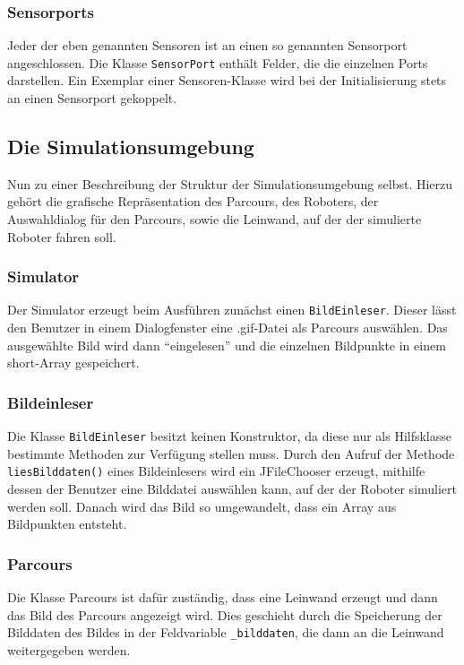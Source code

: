 \documentclass[paper=a4, pagesize, DIV=calc, BCOR=12.5mm, twoside=on, onecolumn=on, open = any, titlepage =on, parskip =half-, headsepline = on, footsepline = on, chapterprefix = on, appendixprefix = off, fontsize = 12pt, numbers = noenddot, abstract = on]{scrbook}
\numberwithin{equation}{chapter}
\theoremstyle{definition}
\theoremstyle{plain}
\theoremstyle{plain}
\theoremstyle{remark}
\theoremstyle{plain}
\theoremstyle{plain}
\begin{document}
\subsubsection{Sensorports}
Jeder der eben genannten Sensoren ist an einen so genannten Sensorport angeschlossen. Die Klasse \texttt{SensorPort} enthält Felder, die die einzelnen Ports darstellen. Ein Exemplar einer Sensoren-Klasse wird bei der Initialisierung stets an einen Sensorport gekoppelt. 

\par \singlespacing
\subsection{Die Simulationsumgebung}
\onehalfspacing
Nun zu einer Beschreibung der Struktur der Simulationsumgebung selbst. Hierzu gehört die grafische Repräsentation des Parcours, des Roboters, der Auswahldialog für den Parcours, sowie die Leinwand, auf der der simulierte Roboter fahren soll.
\subsubsection{Simulator}
Der Simulator erzeugt beim Ausführen zunächst einen \texttt{BildEinleser}. Dieser lässt den Benutzer in einem Dialogfenster eine .gif-Datei als Parcours auswählen. Das ausgewählte Bild wird dann "`eingelesen"' und die einzelnen Bildpunkte in einem short-Array gespeichert.
\subsubsection{Bildeinleser}
Die Klasse \texttt{BildEinleser} besitzt keinen Konstruktor, da diese nur als Hilfsklasse bestimmte Methoden zur Verfügung stellen muss. Durch den Aufruf der Methode\\
\texttt{liesBilddaten()} eines Bildeinlesers wird ein JFileChooser erzeugt, mithilfe dessen der Benutzer eine Bilddatei auswählen kann, auf der der Roboter simuliert werden soll. Danach wird das Bild so umgewandelt, dass ein Array aus Bildpunkten entsteht.
\subsubsection{Parcours}
Die Klasse Parcours ist dafür zuständig, dass eine Leinwand erzeugt und dann das Bild des Parcours angezeigt wird. Dies geschieht durch die Speicherung der Bilddaten des Bildes in der Feldvariable \texttt{{\_}bilddaten}, die dann an die Leinwand weitergegeben werden.\\
\end{document}
